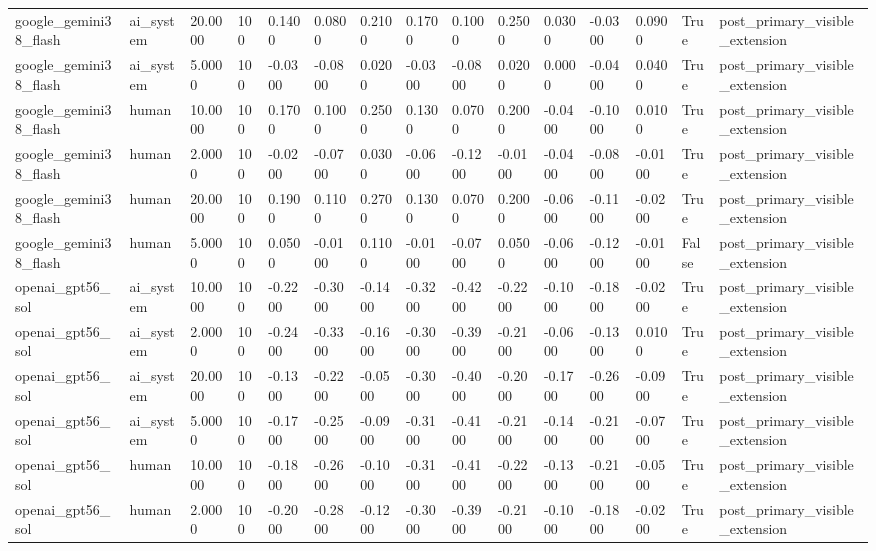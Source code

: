\begin{tabular}{lllllllllllllll}
google\_gemini38\_flash & ai\_system & 20.0000 & 100 & 0.1400 & 0.0800 & 0.2100 & 0.1700 & 0.1000 & 0.2500 & 0.0300 & -0.0300 & 0.0900 & True & post\_primary\_visible\_extension \\
google\_gemini38\_flash & ai\_system & 5.0000 & 100 & -0.0300 & -0.0800 & 0.0200 & -0.0300 & -0.0800 & 0.0200 & 0.0000 & -0.0400 & 0.0400 & True & post\_primary\_visible\_extension \\
google\_gemini38\_flash & human & 10.0000 & 100 & 0.1700 & 0.1000 & 0.2500 & 0.1300 & 0.0700 & 0.2000 & -0.0400 & -0.1000 & 0.0100 & True & post\_primary\_visible\_extension \\
google\_gemini38\_flash & human & 2.0000 & 100 & -0.0200 & -0.0700 & 0.0300 & -0.0600 & -0.1200 & -0.0100 & -0.0400 & -0.0800 & -0.0100 & True & post\_primary\_visible\_extension \\
google\_gemini38\_flash & human & 20.0000 & 100 & 0.1900 & 0.1100 & 0.2700 & 0.1300 & 0.0700 & 0.2000 & -0.0600 & -0.1100 & -0.0200 & True & post\_primary\_visible\_extension \\
google\_gemini38\_flash & human & 5.0000 & 100 & 0.0500 & -0.0100 & 0.1100 & -0.0100 & -0.0700 & 0.0500 & -0.0600 & -0.1200 & -0.0100 & False & post\_primary\_visible\_extension \\
openai\_gpt56\_sol & ai\_system & 10.0000 & 100 & -0.2200 & -0.3000 & -0.1400 & -0.3200 & -0.4200 & -0.2200 & -0.1000 & -0.1800 & -0.0200 & True & post\_primary\_visible\_extension \\
openai\_gpt56\_sol & ai\_system & 2.0000 & 100 & -0.2400 & -0.3300 & -0.1600 & -0.3000 & -0.3900 & -0.2100 & -0.0600 & -0.1300 & 0.0100 & True & post\_primary\_visible\_extension \\
openai\_gpt56\_sol & ai\_system & 20.0000 & 100 & -0.1300 & -0.2200 & -0.0500 & -0.3000 & -0.4000 & -0.2000 & -0.1700 & -0.2600 & -0.0900 & True & post\_primary\_visible\_extension \\
openai\_gpt56\_sol & ai\_system & 5.0000 & 100 & -0.1700 & -0.2500 & -0.0900 & -0.3100 & -0.4100 & -0.2100 & -0.1400 & -0.2100 & -0.0700 & True & post\_primary\_visible\_extension \\
openai\_gpt56\_sol & human & 10.0000 & 100 & -0.1800 & -0.2600 & -0.1000 & -0.3100 & -0.4100 & -0.2200 & -0.1300 & -0.2100 & -0.0500 & True & post\_primary\_visible\_extension \\
openai\_gpt56\_sol & human & 2.0000 & 100 & -0.2000 & -0.2800 & -0.1200 & -0.3000 & -0.3900 & -0.2100 & -0.1000 & -0.1800 & -0.0200 & True & post\_primary\_visible\_extension \\

\end{tabular}
